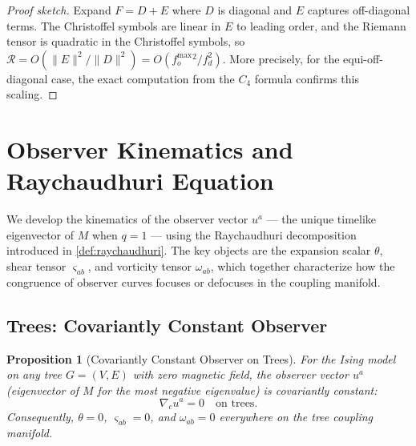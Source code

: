 \documentclass[11pt]{article}
\newtheorem{proposition}[theorem]{Proposition}
\theoremstyle{definition}
\theoremstyle{remark}
\newcommand{\Fish}{F}
\newcommand{\Met}{M}
\newcommand{\obs}{u}
\newcommand{\vort}{\omega}
\newcommand{\Scal}{\mathcal{R}}
\newcommand{\expan}{\theta}
\newcommand{\shear}{\varsigma} %
\begin{document}
\begin{proof}[Proof sketch]
Expand $\Fish = D + E$ where $D$ is diagonal and $E$ captures
off-diagonal terms. The Christoffel symbols are linear in $E$
to leading order, and the Riemann tensor is quadratic in the
Christoffel symbols, so $\Scal = O(\|E\|^2 / \|D\|^2)
= O(f_o^{\max}{}^2 / f_d^2)$. More precisely, for the equi-off-diagonal
case, the exact computation from the $C_4$ formula confirms this
scaling.
\end{proof}


\section{Observer Kinematics and Raychaudhuri Equation}
\label{sec:raychaudhuri}

We develop the kinematics of the observer vector $\obs^a$ --- the unique
timelike eigenvector of $\Met$ when $q = 1$ --- using the Raychaudhuri
decomposition introduced in \cref{def:raychaudhuri}. The key objects are
the expansion scalar $\expan$, shear tensor $\shear_{ab}$, and vorticity
tensor $\vort_{ab}$, which together characterize how the congruence of
observer curves focuses or defocuses in the coupling manifold.

\subsection{Trees: Covariantly Constant Observer}
\label{subsec:trees-constant-observer}

\begin{proposition}[Covariantly Constant Observer on Trees]
\label{prop:tree-observer}
For the Ising model on any tree $G = (V, E)$ with zero magnetic field,
the observer vector $\obs^a$ (eigenvector of $\Met$ for the most negative
eigenvalue) is covariantly constant:
\begin{equation}
  \nabla_c \obs^a = 0 \quad \text{on trees.}
  \label{eq:cov-const-observer}
\end{equation}
Consequently, $\expan = 0$, $\shear_{ab} = 0$, and $\vort_{ab} = 0$
everywhere on the tree coupling manifold.
\end{proposition}
\end{document}
